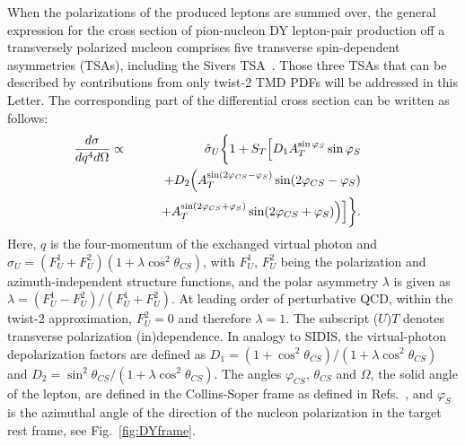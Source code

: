 \documentclass[a4paper,manyauthors,nocleardouble,COMPASS]{cernphprep}
\newcommand{\lf}{\left}
\newcommand{\rg}{\right}
\newcommand{\phiCS}{\varphi _{CS}}
\newcommand{\phiS}{\varphi _S}
\newcommand{\thCS}{\theta _{CS}}
\begin{document}
When the polarizations of the produced leptons are summed over, the general expression for the cross section of pion-nucleon DY lepton-pair production off a transversely polarized nucleon comprises five transverse spin-dependent asymmetries (TSAs), including the Sivers TSA~\cite{Arnold:2008kf,Gautheron:2010wva}. Those three TSAs that can be described by contributions from only twist-2 TMD PDFs will be addressed in this Letter. The corresponding part of the differential cross section  can be written as follows:
\vskip 0.5cm
\begin{eqnarray}\label{eq:DY_xsecLO}\nonumber
  \hspace*{-0.9cm}\frac{d\sigma}{dq^{4}d\Omega} &\propto& \hat{\sigma}_{U}
  \bigg\{ 1 +  {S_T}\Big[ D_{1}A_T^{\sin\phiS}\sin\phiS\\ \nonumber
   &&
       +D_{2}\Big( A_T^{\sin(2\phiCS-\phiS)}\sin(2\phiCS-\phiS) \\
    &&
   \qquad+ A_T^{\sin(2\phiCS+\phiS)}\sin(2\phiCS+\phiS) \Big)
   \Big] \bigg\}.
\end{eqnarray}
%
Here, $q$ is the four-momentum of the exchanged virtual photon and $\hat{\sigma}_{U} =  \lf({F^{1}_{U}}+{F^{2}_{U}}\rg)\lf(1 + \lambda{{\cos}^2}\thCS \rg)$, with $F^{1}_{U}$, $F^{2}_{U}$ being the polarization and azimuth-independent structure functions, and the polar asymmetry $\lambda$ is given as $\lambda=\lf({F^{1}_{U}}-{F^{2}_{U}}\rg)/\lf({F^{1}_{U}}+{F^{2}_{U}}\rg)$. At leading order of  perturbative QCD, within the twist-2 approximation, $F^{2}_{U}=0$ and therefore $\lambda=1$. The subscript ($U$)$T$ denotes transverse polarization (in)dependence. In analogy to SIDIS, the virtual-photon depolarization factors are defined as $D_{1}=(1+{{\cos}^2}\thCS)/\lf(1 + \lambda{{\cos }^2}\thCS \rg)$ and $D_{2}={{\sin}^2}\thCS/\lf(1 + \lambda{{\cos }^2}\thCS \rg)$. The angles $\phiCS$, $\thCS$ and $\Omega$, the solid angle of the lepton, are defined in the Collins-Soper frame as defined in Refs.~\cite{Arnold:2008kf,Gautheron:2010wva}, and $\phiS$ is the azimuthal angle of the direction of the nucleon polarization in the target rest frame, see Fig.~\ref{fig:DYframe}.
%
%
%
%
%
\end{document}
